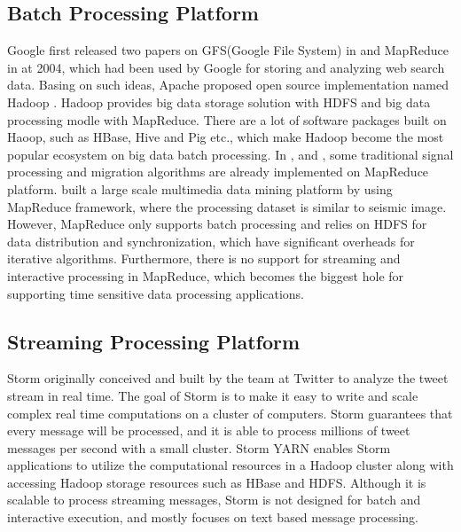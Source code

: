 \subsection{Batch Processing Platform}
Google first released two papers on GFS(Google File System) in \cite{GhemawatGFS945450} and MapReduce in \cite{DeanMSD1251264} at 2004, which had been used by Google for storing and analyzing web search data. Basing on such ideas, Apache proposed open source implementation named Hadoop \cite{ApacheHadoop}. Hadoop provides big data storage solution with HDFS and big data processing modle with MapReduce. There are a lot of software packages built on Haoop, such as HBase, Hive and Pig etc., which make Hadoop become the most popular ecosystem on big data batch processing. In \cite{2432874MohammadzaheriDISRAYMapReduce}, \cite{6118958RizvandiMapRecudePKTM} and \cite{2745578AddairSeismicSignalHadoop}, some traditional signal processing and migration algorithms are already implemented on MapReduce platform. \cite{6427595WangMultimediaMapReduce} built a large scale multimedia data mining platform by using MapReduce framework, where the processing dataset is similar to seismic image. However,  MapReduce only supports batch processing and relies on HDFS for data distribution and synchronization, which have significant overheads for iterative algorithms. Furthermore, there is no support for streaming and interactive processing in MapReduce, which becomes the biggest hole for supporting time sensitive data processing applications.

\subsection{Streaming Processing Platform}
Storm \cite{ApacheStorm} originally conceived and built by the team at Twitter to analyze the tweet stream in real time. The goal of Storm is to make it easy to write and scale complex real time computations on a cluster of computers. Storm guarantees that every message will be processed, and it is able to process millions of tweet messages per second with a small cluster. 
Storm YARN enables Storm applications to utilize the computational resources in a Hadoop cluster along with accessing Hadoop storage resources such as HBase\cite{ApacheHBase} and HDFS. Although it is scalable to process streaming messages, Storm is not designed for batch and interactive execution, and mostly focuses on text based message processing. 

